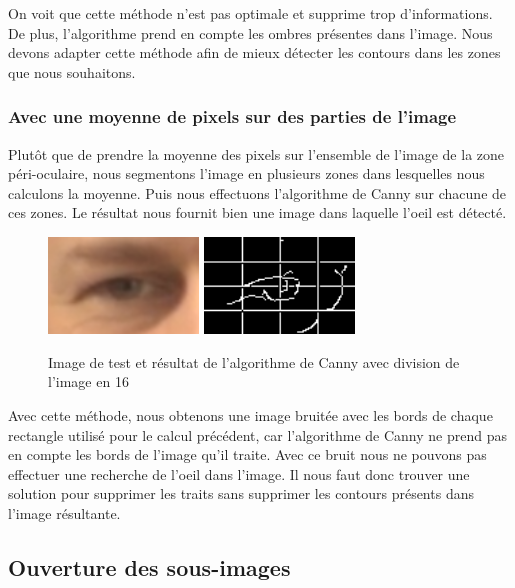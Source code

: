 On voit que cette méthode n'est pas optimale et supprime trop d'informations. De plus,
l'algorithme prend en compte les ombres présentes dans l'image. Nous devons adapter cette méthode
afin de mieux détecter les contours dans les zones que nous souhaitons.

\subsubsection{Avec une moyenne de pixels sur des parties de l'image}

Plutôt que de prendre la moyenne des pixels sur l'ensemble de l'image de la zone péri-oculaire, nous segmentons l'image
en plusieurs zones dans lesquelles nous calculons la moyenne. Puis nous effectuons l'algorithme
de Canny sur chacune de ces zones. Le résultat nous fournit bien une image dans laquelle l'oeil
est détecté.

\begin{figure}[H]
 \center
 \includegraphics[width=4cm]{image/original.png}
 \includegraphics[width=4cm]{image/canny_decomposition.png}
 \caption{Image de test et résultat de l'algorithme de Canny avec division de l'image en 16}
\end{figure}

Avec cette méthode, nous obtenons une image bruitée avec les bords de chaque rectangle utilisé
pour le calcul précédent, car l'algorithme de Canny ne prend pas en compte les bords de l'image
qu'il traite. Avec ce bruit nous ne pouvons pas effectuer une recherche de l'oeil dans
l'image. Il nous faut donc trouver une solution pour supprimer les traits
sans supprimer les contours présents dans l'image résultante.

\subsection{Ouverture des sous-images}

